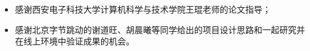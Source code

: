 \begin{itemize}
    \item 感谢西安电子科技大学计算机科学与技术学院王琨老师的论文指导；
    \item 感谢北京字节跳动的谢道旺、胡晨曦等同学给出的项目设计思路和一起研究并在线上环境中验证成果的机会。
\end{itemize}